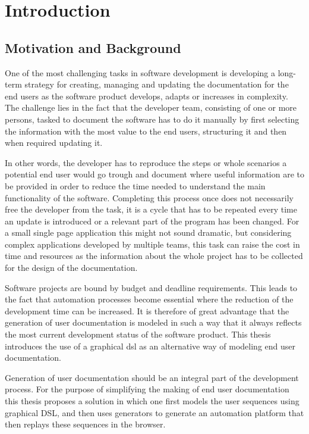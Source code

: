 \chapter{Introduction}
\section{Motivation and Background}
One of the most challenging tasks in software development is developing a long-term strategy for creating, managing and updating the documentation for the end users as the software product develops, adapts or increases in complexity. The challenge lies in the fact that the developer team, consisting of one or more persons, tasked to document the software has to do it manually by first selecting the information with the most value to the end users, structuring it and then when required updating it.

In other words, the developer has to reproduce the steps or whole scenarios a potential end user would go trough and document where useful information are to be provided in order to reduce the time needed to understand the main functionality of the software. Completing this process once does not necessarily free the developer from the task, it is a cycle that has to be repeated every time an update is introduced or a relevant part of the program has been changed. For a small single page application this might not sound dramatic, but considering complex applications developed by multiple teams, this task can raise the cost in time and resources as the information about the whole project has to be collected for the design of the documentation\cite{5712775}.

Software projects are bound by budget and deadline requirements. This leads to the fact that automation processes become essential where the reduction of the development time can be increased. It is therefore of great advantage that the generation of user documentation is modeled in such a way that it always reflects the most current development status of the software product. This thesis introduces the use of a graphical \acrfull{dsl} as an alternative way of modeling end user documentation.

Generation of user documentation should be an integral part of the development process. For the purpose of simplifying the making of end user documentation this thesis proposes a solution in which one first models the user sequences using graphical DSL, and then uses generators to generate an automation platform that then replays these sequences in the browser.

